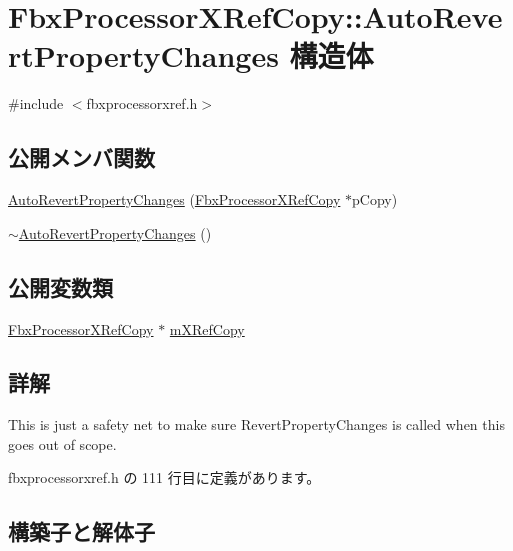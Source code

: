 \hypertarget{struct_fbx_processor_x_ref_copy_1_1_auto_revert_property_changes}{}\section{Fbx\+Processor\+X\+Ref\+Copy\+:\+:Auto\+Revert\+Property\+Changes 構造体}
\label{struct_fbx_processor_x_ref_copy_1_1_auto_revert_property_changes}


{\ttfamily \#include $<$fbxprocessorxref.\+h$>$}

\subsection*{公開メンバ関数}
\begin{DoxyCompactItemize}
\item 
\hyperlink{struct_fbx_processor_x_ref_copy_1_1_auto_revert_property_changes_a1fa531d7bd5f1c01dca29037e603eb1e}{Auto\+Revert\+Property\+Changes} (\hyperlink{class_fbx_processor_x_ref_copy}{Fbx\+Processor\+X\+Ref\+Copy} $\ast$p\+Copy)
\item 
\hyperlink{struct_fbx_processor_x_ref_copy_1_1_auto_revert_property_changes_a1ab425cf2d1b2a467367492ff5bff062}{$\sim$\+Auto\+Revert\+Property\+Changes} ()
\end{DoxyCompactItemize}
\subsection*{公開変数類}
\begin{DoxyCompactItemize}
\item 
\hyperlink{class_fbx_processor_x_ref_copy}{Fbx\+Processor\+X\+Ref\+Copy} $\ast$ \hyperlink{struct_fbx_processor_x_ref_copy_1_1_auto_revert_property_changes_a7a3b1268b589b017662d0830f14dfe2c}{m\+X\+Ref\+Copy}
\end{DoxyCompactItemize}


\subsection{詳解}
This is just a safety net to make sure Revert\+Property\+Changes is called when this goes out of scope. 

 fbxprocessorxref.\+h の 111 行目に定義があります。



\subsection{構築子と解体子}
\mbox{\label{struct_fbx_processor_x_ref_copy_1_1_auto_revert_property_changes_a1fa531d7bd5f1c01dca29037e603eb1e}} 

